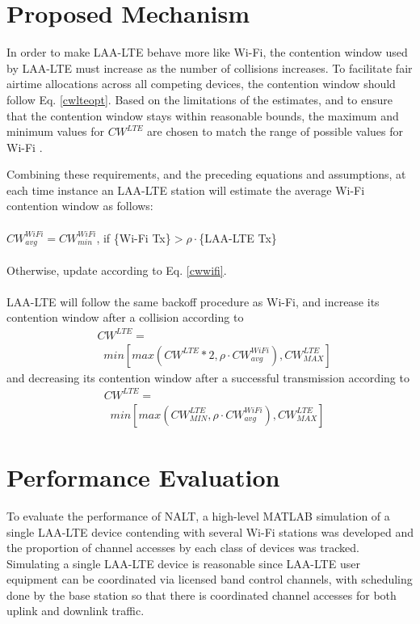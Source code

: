 \section{Proposed Mechanism}
\label{proposed}
In order to make \mbox{LAA-LTE} behave more like \mbox{Wi-Fi}, the contention window used by \mbox{LAA-LTE} must increase as the number of collisions increases.  To facilitate fair airtime allocations across all competing devices, the contention window should follow Eq. \ref{cwlteopt}.  Based on the limitations of the estimates, and to ensure that the contention window stays within reasonable bounds, the maximum and minimum values for $CW^{LTE}$ are chosen to match the range of possible values for \mbox{Wi-Fi} \cite{80211}.  

Combining these requirements, and the preceding equations and assumptions, at each time instance an \mbox{LAA-LTE} station will estimate the average \mbox{Wi-Fi} contention window as follows:\\ \\$CW^{WiFi}_{avg} = CW^{WiFi}_{min}$, if \{\mbox{Wi-Fi} Tx\}$> \rho\cdot$\{\mbox{LAA-LTE} Tx\} \\ \\Otherwise, update according to Eq. \ref{cwwifi}.
\\ \\
\mbox{LAA-LTE} will follow the same backoff procedure as \mbox{Wi-Fi}, and increase its contention window after a collision according to
\begin{align*}
&CW^{LTE}=\\&\;\;min\left[max\left(CW^{LTE}*2,\rho \cdot CW^{WiFi}_{avg}\right), CW^{LTE}_{MAX}\right]
\end{align*}
and decreasing its contention window after a successful transmission according to 
\begin{align*}
&CW^{LTE}=\\&\;\;min\left[max\left(CW^{LTE}_{MIN},\rho \cdot CW^{WiFi}_{avg}\right), CW^{LTE}_{MAX}\right]
\end{align*}


\section{Performance Evaluation}
To evaluate the performance of NALT, a high-level MATLAB simulation of a single \mbox{LAA-LTE} device contending with several \mbox{Wi-Fi} stations was developed and the proportion of channel accesses by each class of devices was tracked.  Simulating a single \mbox{LAA-LTE} device is reasonable since \mbox{LAA-LTE} user equipment can be coordinated via licensed band control channels, with scheduling done by the base station so that there is coordinated channel accesses for both uplink and downlink traffic.
\label{perf-eval}

